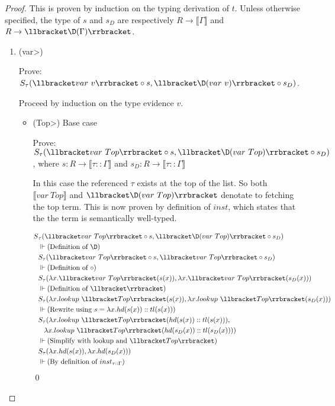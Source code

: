 
  \begin{proof}

    This is proven by induction on the typing derivation of $t$.
    Unless otherwise specified, the type of $s$ and $s_D$ are respectively $R \rightarrow \llbracket \Gamma \rrbracket$ and $R \rightarrow \llbracket \D(\Gamma) \rrbracket$.
    \begin{enumerate}
      \item (\<var>)

        Prove: $S_\tau(\llbracket var\ v \rrbracket \circ s, \llbracket \D(var\ v) \rrbracket \circ s_D)$.

        Proceed by induction on the type evidence $v$.
        \begin{itemize}
          \item(\<Top>) Base case

          Prove: $S_\tau(\llbracket var\ Top \rrbracket \circ s, \llbracket \D(var\ Top) \rrbracket \circ s_D)$, where $s : R \rightarrow \llbracket \tau :: \Gamma \rrbracket$ and $s_D : R \rightarrow \llbracket \tau :: \Gamma \rrbracket$

          In this case the referenced $\tau$ exists at the top of the list.
          So both $\llbracket var\ Top \rrbracket$ and $\llbracket \D(var\ Top) \rrbracket$ denotate to fetching the top term.
          This is now proven by definition of $inst$, which states that the the term is semantically well-typed.

          \begin{align*}
            S&_\tau(\llbracket var\ Top \rrbracket \circ s, \llbracket \D(var\ Top) \rrbracket \circ s_D) \\
            &\Vdash \text{(Definition of $\D$)} \\
            & S_\tau(\llbracket var\ Top \rrbracket \circ s, \llbracket var\ Top \rrbracket \circ s_D) \\
            &\Vdash \text{(Definition of $\circ$)} \\
            & S_\tau(\lambda x. \llbracket var\ Top \rrbracket (s(x)), \lambda x. \llbracket var\ Top \rrbracket (s_D(x))) \\
            &\Vdash \text{(Definition of $\llbracket\rrbracket$)} \\
            & S_\tau(\lambda x. lookup\ \llbracket Top \rrbracket (s(x)), \lambda x. lookup\ \llbracket Top \rrbracket (s_D(x))) \\
            &\Vdash \text{(Rewrite using $s = \lambda x. hd(s(x))::tl(s(x))$)} \\
            & S_\tau(\lambda x. lookup\ \llbracket Top \rrbracket (hd(s(x))::tl(s(x))), \\
              & \;\;\; \lambda x. lookup\ \llbracket Top \rrbracket (hd(s_D(x))::tl(s_D(x)))) \\
            & \Vdash \text{(Simplify with lookup and $\llbracket Top \rrbracket$)} \\
            & S_\tau(\lambda x. hd(s(x)), \lambda x. hd(s_D(x))) \\
            & \Vdash \text{(By definition of $inst_{\tau::\Gamma}$)} \\
          \end{align*} \qed


\end{itemize}
\end{enumerate}
\end{proof}
